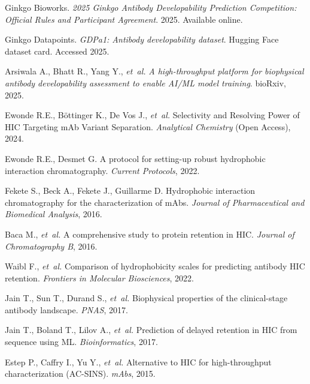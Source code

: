 \documentclass[11pt]{article}
\begin{document}
\begin{thebibliography}{99}

Ginkgo Bioworks. \emph{2025 Ginkgo Antibody Developability Prediction Competition: Official Rules and Participant Agreement}. 2025. Available online.

Ginkgo Datapoints. \emph{GDPa1: Antibody developability dataset}. Hugging Face dataset card. Accessed 2025.

Arsiwala A., Bhatt R., Yang Y., \emph{et~al.} \emph{A high-throughput platform for biophysical antibody developability assessment to enable AI/ML model training}. bioRxiv, 2025.

Ewonde R.E., Böttinger K., De Vos J., \emph{et~al.} Selectivity and Resolving Power of HIC Targeting mAb Variant Separation. \emph{Analytical Chemistry} (Open Access), 2024.

Ewonde R.E., Desmet G. A protocol for setting-up robust hydrophobic interaction chromatography. \emph{Current Protocols}, 2022.

Fekete S., Beck A., Fekete J., Guillarme D. Hydrophobic interaction chromatography for the characterization of mAbs. \emph{Journal of Pharmaceutical and Biomedical Analysis}, 2016.

Baca M., \emph{et~al.} A comprehensive study to protein retention in HIC. \emph{Journal of Chromatography B}, 2016.

Waibl F., \emph{et~al.} Comparison of hydrophobicity scales for predicting antibody HIC retention. \emph{Frontiers in Molecular Biosciences}, 2022.

Jain T., Sun T., Durand S., \emph{et~al.} Biophysical properties of the clinical-stage antibody landscape. \emph{PNAS}, 2017.

Jain T., Boland T., Lilov A., \emph{et~al.} Prediction of delayed retention in HIC from sequence using ML. \emph{Bioinformatics}, 2017.

Estep P., Caffry I., Yu Y., \emph{et~al.} Alternative to HIC for high-throughput characterization (AC-SINS). \emph{mAbs}, 2015.


\end{thebibliography}
\end{document}
